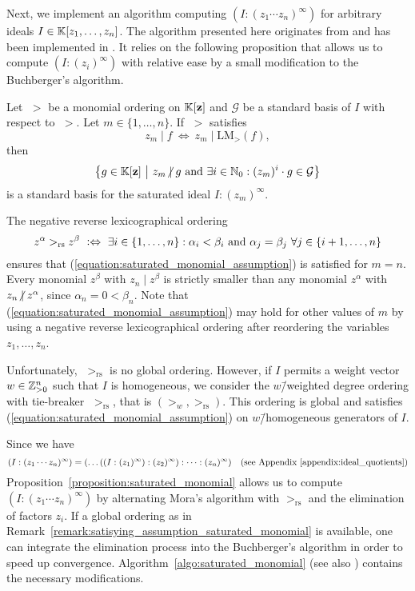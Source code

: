 Next, we implement an algorithm computing $(I : (z_1\cdots z_n)^\infty)$ for arbitrary ideals $I\in\mathbb{K}[z_1,\dots,z_n]$. The algorithm presented here originates from \cite{gitfan_symmetry} and has been implemented in \gitfanlib. It relies on the following proposition that allows us to compute $(I : (z_i)^\infty)$ with relative ease by a small modification to the Buchberger's algorithm.

\begin{prop}
	\label{proposition:saturated_monomial}
	Let $\;>$ be a monomial ordering on $\mathbb{K}[\mathbf{z}]$ and $\mathcal{G}$ be a standard basis of $I$ with respect to $\;>$. Let $m\in\{1,\dots,n\}$. If $\;>$ satisfies
	\begin{equation}
		\label{equation:saturated_monomial_assumption}
		z_m \mid f\ \Leftrightarrow\ z_m \mid \text{LM}_>(f),
	\end{equation}
	then
	$$\left\{g\in\field[\mathbf{z}]\ \middle|\ z_m \centernot\mid g\ \mathrm{and}\ \exists i\in\natural_0: (z_m)^i \cdot g \in \mathcal{G}\right\}$$
	is a standard basis for the saturated ideal $I : (z_m)^\infty$. 
\end{prop}

\begin{remark}
	\label{remark:satisying_assumption_saturated_monomial}
	The negative reverse lexicographical ordering
	$$z^\alpha >_\text{rs} z^\beta\ \defequiv\ \exists i\in\{1,\dots,n\}: \alpha_i < \beta_i\ \text{and}\ \alpha_j = \beta_j\ \forall j\in\{i+1,\dots,n\}$$
	ensures that (\ref{equation:saturated_monomial_assumption}) is satisfied for $m=n$. Every monomial $z^\beta$ with $z_n \mid z^\beta$ is strictly smaller than any monomial $z^\alpha$ with $z_n \centernot\mid z^\alpha$, since $\alpha_n = 0 < \beta_n$. Note that (\ref{equation:saturated_monomial_assumption}) may hold for other values of $m$ by using a negative reverse lexicographical ordering after reordering the variables $z_1,\dots,z_n$.
	
	Unfortunately, $\;>_\text{rs}$ is no global ordering. However, if $I$ permits a weight vector $w\in\mathbb{Z}^n_{>0}$ such that $I$ is homogeneous, we consider the $w$\=/weighted degree ordering with tie-breaker $\;>_\text{rs}$, that is $(>_w, >_\text{rs})$. This ordering is global and satisfies (\ref{equation:saturated_monomial_assumption}) on $w$\=/homogeneous generators of $I$.
\end{remark}

Since we have
$$(I:(z_1\cdots z_n)^\infty) = (\dots((I:(z_1)^\infty):(z_2)^\infty):\dots : (z_n)^\infty)\quad\text{(see Appendix \ref{appendix:ideal_quotients})}$$
Proposition~\ref{proposition:saturated_monomial} allows us to compute $(I : (z_1\cdots z_n)^\infty)$ by alternating Mora's algorithm with $>_\text{rs}$ and the elimination of factors $z_i$. If a global ordering as in Remark~\ref{remark:satisying_assumption_saturated_monomial} is available, one can integrate the elimination process into the Buchberger's algorithm in order to speed up convergence. Algorithm~\ref{algo:saturated_monomial} (see also \cite[Algorithm 3.3]{gitfan_symmetry}) contains the necessary modifications.

